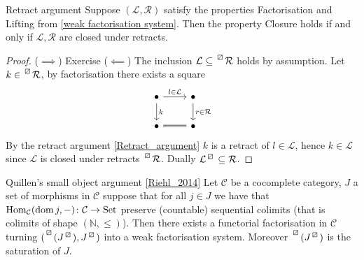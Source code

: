 \begin{lem}{Retract argument}
\label{Retract_argument}
    Suppose $(\mathcal{L}, \mathcal{R})$ satisfy the properties Factorisation and Lifting from \cref{weak factorisation system}.
    Then the property Closure holds if and only if $\mathcal{L}, \mathcal{R}$ are closed under retracts.
\end{lem}

\begin{proof}
    ($\implies$) Exercise
    ($\impliedby$) The inclusion $\mathcal{L} \subseteq \prescript{\lift{}}{}{\mathcal{R}}$ holds by assumption. 
    Let $k \in \prescript{\lift{}}{}{\mathcal{R}}$, by factorisation there exists a square 
    \[
    \begin{tikzcd}
        \bullet 
        \ar[r, "l \in \mathcal{L}"]
        \ar[d, "k"]
        &
        \bullet
        \ar[d, "r \in \mathcal{R}"]
        \\
        \bullet
        \ar[r, equal]
        &
        \bullet
    \end{tikzcd}
    \]
    By the retract argument \cref{Retract_argument} $k$ is a retract of $l \in \mathcal{L}$, hence $k \in \mathcal{L}$ since $\mathcal{L}$ is closed under retracts $\prescript{\lift{}}{}{\mathcal{R}}$. 
    Dually $\mathcal{L}^{\lift{}} \subseteq \mathcal{R}$.
\end{proof}

\begin{thm}{Quillen's small object argument}
\cref{Riehl_2014}
\label{Quillen's small object argument}
    Let $\mathcal{C}$ be a cocomplete category, $J$ a set of morphisms in $\mathcal{C}$ suppose that for all $j \in J$ we have that $\operatorname{Hom}_{\mathcal{C}}(\operatorname{dom} j,-)\colon \mathcal{C} \to \operatorname{Set}$ preserve (countable) sequential colimits (that is colimits of shape $(\mathbb{N}, \leq )$).
    Then there exists a functorial factorisation in $\mathcal{C}$ turning $(\prescript{\lift{}}{}{(J^{\lift{}})},J^{\lift{}})$ into a weak factorisation system.
    Moreover $\prescript{\lift{}}{}{(J^{\lift{}})}$ is the saturation of $J$.
\end{thm}

